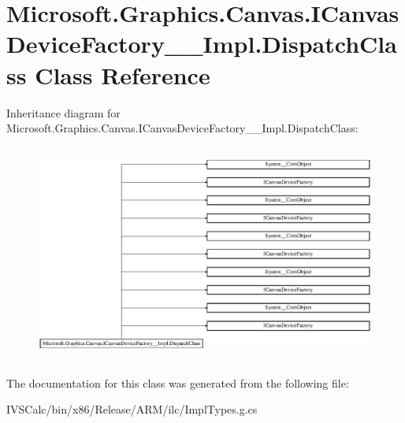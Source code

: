 \hypertarget{class_microsoft_1_1_graphics_1_1_canvas_1_1_i_canvas_device_factory_____impl_1_1_dispatch_class}{}\section{Microsoft.\+Graphics.\+Canvas.\+I\+Canvas\+Device\+Factory\+\_\+\+\_\+\+Impl.\+Dispatch\+Class Class Reference}
\label{class_microsoft_1_1_graphics_1_1_canvas_1_1_i_canvas_device_factory_____impl_1_1_dispatch_class}
Inheritance diagram for Microsoft.\+Graphics.\+Canvas.\+I\+Canvas\+Device\+Factory\+\_\+\+\_\+\+Impl.\+Dispatch\+Class\+:\begin{figure}[H]
\begin{center}
\leavevmode
\includegraphics[height=7.179487cm]{class_microsoft_1_1_graphics_1_1_canvas_1_1_i_canvas_device_factory_____impl_1_1_dispatch_class}
\end{center}
\end{figure}


The documentation for this class was generated from the following file\+:\begin{DoxyCompactItemize}
\item 
I\+V\+S\+Calc/bin/x86/\+Release/\+A\+R\+M/ilc/Impl\+Types.\+g.\+cs\end{DoxyCompactItemize}
